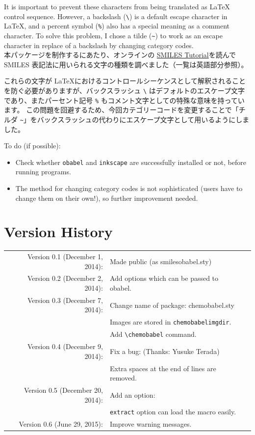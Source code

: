 \documentclass[12pt]{jsarticle}
\begin{document}
It is important to prevent these characters from being translated as {\LaTeX} control sequence.
However, a backslash (\verb|\|) is a default escape character in {\LaTeX}, and a percent symbol (\verb|%|) also has a special meaning as a comment character.
To solve this problem, I chose a tilde (\verb|~|) to work as an escape character in replace of a backslash by changing category codes. \\

本パッケージを制作するにあたり、オンラインの \href{http://www.daylight.com/meetings/summerschool98/course/dave/smiles-intro.html}{SMILES Tutorial}を読んで SMILES 表記法に用いられる文字の種類を調べました（一覧は英語部分参照）。

これらの文字が \LaTeX におけるコントロールシーケンスとして解釈されることを防ぐ必要がありますが、バックスラッシュ \verb|\| はデフォルトのエスケープ文字であり、またパーセント記号 \verb|%| もコメント文字としての特殊な意味を持っています。
この問題を回避するため、今回カテゴリーコードを変更することで「チルダ \verb|~|」をバックスラッシュの代わりにエスケープ文字として用いるようにしました。

\clearpage

To do (if possible):
\begin{itemize}
\item Check whether \texttt{obabel} and \texttt{inkscape} are successfully installed or not, before running programs.
\item The method for changing category codes is not sophisticated (users have to change them on their own!), so further improvement needed.
\end{itemize}

\section{Version History}

\begin{table}[h]
\centering
\begin{tabular}{rll}
Version 0.1 (December 1, 2014): & Made public (as \textsf{smilesobabel.sty}) \\
Version 0.2 (December 2, 2014): & Add options which can be passed to obabel. \\
Version 0.3 (December 7, 2014): & Change name of package: \textsf{chemobabel.sty} \\
 & Images are stored in \texttt{chemobabelimgdir}. \\
 & Add \verb|\chemobabel| command. \\
Version 0.4 (December 9, 2014): & Fix a bug: (Thanks: Yusuke Terada) \\
 & Extra spaces at the end of lines are removed. \\
Version 0.5 (December 20, 2014): & Add an option: \\
 & \verb|extract| option can load the macro easily. \\
Version 0.6 (June 29, 2015): & Improve warning messages.
\end{tabular}
\end{table}
\end{document}
